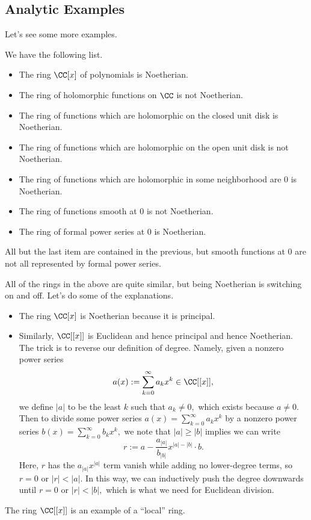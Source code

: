 \documentclass[../notes.tex]{subfiles}
\begin{document}
\subsection{Analytic Examples}
Let's see some more examples.
\begin{ex}
	We have the following list.
	\begin{itemize}
		\item The ring $\CC[x]$ of polynomials is Noetherian.
		\item The ring of holomorphic functions on $\CC$ is {\color{red}not} Noetherian.
		\item The ring of functions which are holomorphic on the closed unit disk is Noetherian.
		\item The ring of functions which are holomorphic on the open unit disk is {\color{red}not} Noetherian.
		\item The ring of functions which are holomorphic in some neighborhood are $0$ is Noetherian.
		\item The ring of functions smooth at $0$ is {\color{red}not} Noetherian.
		\item The ring of formal power series at $0$ is Noetherian.
	\end{itemize}
	All but the last item are contained in the previous, but smooth functions at $0$ are not all represented by formal power series.
\end{ex}
All of the rings in the above are quite similar, but being Noetherian is switching on and off. Let's do some of the explanations.
\begin{itemize}
	\item The ring $\CC[x]$ is Noetherian because it is principal.
	\item Similarly, $\CC[[x]]$ is Euclidean and hence principal and hence Noetherian. The trick is to reverse our definition of degree. Namely, given a nonzero power series
	\[a(x):=\sum_{k=0}^\infty a_kx^k\in\CC[[x]],\]
	we define $|a|$ to be the least $k$ such that $a_k\ne0,$ which exists because $a\ne0.$ Then to divide some power series $a(x)=\sum_{k=0}^\infty a_kx^k$ by a nonzero power series $b(x)=\sum_{k=0}^\infty b_kx^k,$ we note that $|a|\ge|b|$ implies we can write
	\[r:=a-\frac{a_{|a|}}{b_{|b|}}x^{|a|-|b|}\cdot b.\]
	Here, $r$ has the $a_{|a|}x^{|a|}$ term vanish while adding no lower-degree terms, so $r=0$ or $|r|<|a|.$ In this way, we can inductively push the degree downwards until $r=0$ or $|r|<|b|,$ which is what we need for Euclidean division.
\end{itemize}
\begin{remark}
	The ring $\CC[[x]]$ is an example of a ``local'' ring.
\end{remark}
\end{document}

